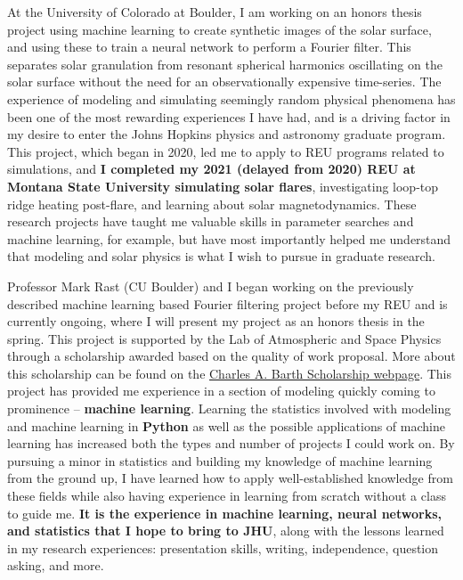 \documentclass[11pt,letterpaper]{article}
\begin{document}
At the University of Colorado at Boulder, I am working on an honors thesis project using machine learning to create synthetic images of the solar surface, and using these to train a neural network to perform a Fourier filter. This separates solar granulation from resonant spherical harmonics oscillating on the solar surface without the need for an observationally expensive time-series. The experience of modeling and simulating seemingly random physical phenomena has been one of the most rewarding experiences I have had, and is a driving factor in my desire to enter the Johns Hopkins physics and astronomy graduate program. This project, which began in 2020, led me to apply to REU programs related to simulations, and \textbf{I completed my 2021 (delayed from 2020) REU at Montana State University simulating solar flares}, investigating loop-top ridge heating post-flare, and learning about solar magnetodynamics. These research projects have taught me valuable skills in parameter searches and machine learning, for example, but have most importantly helped me understand that modeling and solar physics is what I wish to pursue in graduate research.
 
Professor Mark Rast (CU Boulder) and I began working on the previously described machine learning based Fourier filtering project before my REU and is currently ongoing, where I will present my project as an honors thesis in the spring. This project is supported by the Lab of Atmospheric and Space Physics through a scholarship awarded based on the quality of work proposal. More about this scholarship can be found on the \href{https://lasp.colorado.edu/home/about/scholarships-and-fellowships/the-charles-a-barth-scholarship-in-space-research/}{Charles A. Barth Scholarship webpage}. This project has provided me experience in a section of modeling quickly coming to prominence -- \textbf{machine learning}. Learning the statistics involved with modeling and machine learning in \textbf{Python} as well as the possible applications of machine learning has increased both the types and number of projects I could work on. By pursuing a minor in statistics and building my knowledge of machine learning from the ground up, I have learned how to apply well-established knowledge from these fields while also having experience in learning from scratch without a class to guide me. \textbf{It is the experience in machine learning, neural networks, and statistics that I hope to bring to JHU}, along with the lessons learned in my research experiences: presentation skills, writing, independence, question asking, and more.
\end{document}
